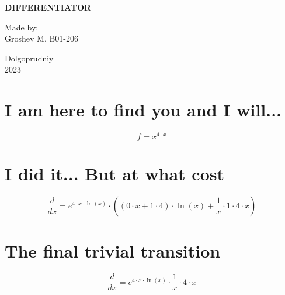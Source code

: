 \documentclass[a4paper, 12pt]{article}
\title{}
\date{}
\begin{document}

    \begin{titlepage}
    \maketitle
    \thispagestyle{empty}

            \begin{center}
                  \Large \textbf{DIFFERENTIATOR}
            \end{center}

             \vspace{20em}
             \begin{flushright}
                 \normalsize Made by: \\
                             Groshev M. B01-206
             \end{flushright}

             \begin{center}
                    \vfill \normalsize Dolgoprudniy \\ 2023
             \end{center}
    \end{titlepage}


\section{I am here to find you and I will...}\begin{equation*}
    f = {{x}}^{{{4}}\cdot{{x}}}
\end{equation*}

\section{I did it... But at what cost}\begin{equation*}
    \frac{d}{dx} = {{{e}}^{{{{4}}\cdot{{x}}}\cdot{\ln({{x}})}}}\cdot{({{({{{0}}\cdot{{x}}}+{{{1}}\cdot{{4}}})}\cdot{\ln({{x}})}}+{{{\frac{{1}}{{x}}}\cdot{{1}}}\cdot{{{4}}\cdot{{x}}}})}
\end{equation*}

\section{The final trivial transition}\begin{equation*}
    \frac{d}{dx} = {{{e}}^{{{{4}}\cdot{{x}}}\cdot{\ln({{x}})}}}\cdot{{\frac{{1}}{{x}}}\cdot{{{4}}\cdot{{x}}}}
\end{equation*}
\end{document}
